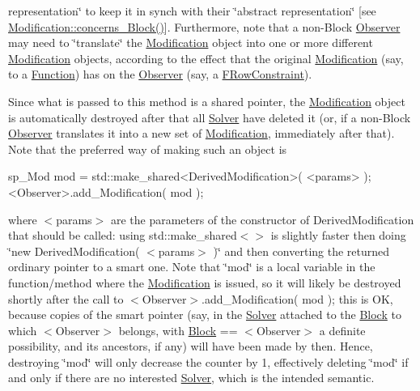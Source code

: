 representation\char`\"{} to keep it in synch with their \char`\"{}abstract representation\char`\"{} \mbox{[}see \mbox{\hyperlink{class_s_m_spp__di__unipi__it_1_1_modification_a22fe0cccfc755cfd89b240587d1f1cad}{Modification\+::concerns\+\_\+\+Block()}}\mbox{]}. Furthermore, note that a non-\/\+Block \mbox{\hyperlink{class_s_m_spp__di__unipi__it_1_1_observer}{Observer}} may need to \char`\"{}translate\char`\"{} the \mbox{\hyperlink{class_s_m_spp__di__unipi__it_1_1_modification}{Modification}} object into one or more different \mbox{\hyperlink{class_s_m_spp__di__unipi__it_1_1_modification}{Modification}} objects, according to the effect that the original \mbox{\hyperlink{class_s_m_spp__di__unipi__it_1_1_modification}{Modification}} (say, to a \mbox{\hyperlink{class_s_m_spp__di__unipi__it_1_1_function}{Function}}) has on the \mbox{\hyperlink{class_s_m_spp__di__unipi__it_1_1_observer}{Observer}} (say, a \mbox{\hyperlink{class_s_m_spp__di__unipi__it_1_1_f_row_constraint}{F\+Row\+Constraint}}).

Since what is passed to this method is a shared pointer, the \mbox{\hyperlink{class_s_m_spp__di__unipi__it_1_1_modification}{Modification}} object is automatically destroyed after that all \mbox{\hyperlink{class_s_m_spp__di__unipi__it_1_1_solver}{Solver}} have deleted it (or, if a non-\/\+Block \mbox{\hyperlink{class_s_m_spp__di__unipi__it_1_1_observer}{Observer}} translates it into a new set of \mbox{\hyperlink{class_s_m_spp__di__unipi__it_1_1_modification}{Modification}}, immediately after that). Note that the preferred way of making such an object is \begin{DoxyVerb}sp_Mod mod = std::make_shared<DerivedModification>( <params> );
<Observer>.add_Modification( mod );
\end{DoxyVerb}


where $<$params$>$ are the parameters of the constructor of Derived\+Modification that should be called\+: using std\+::make\+\_\+shared$<$$>$ is slightly faster then doing \char`\"{}new Derived\+Modification( $<$params$>$ )\char`\"{} and then converting the returned ordinary pointer to a smart one. Note that \char`\"{}mod\char`\"{} is a local variable in the function/method where the \mbox{\hyperlink{class_s_m_spp__di__unipi__it_1_1_modification}{Modification}} is issued, so it will likely be destroyed shortly after the call to $<$\+Observer$>$.add\+\_\+\+Modification( mod ); this is OK, because copies of the smart pointer (say, in the \mbox{\hyperlink{class_s_m_spp__di__unipi__it_1_1_solver}{Solver}} attached to the \mbox{\hyperlink{class_s_m_spp__di__unipi__it_1_1_block}{Block}} to which $<$\+Observer$>$ belongs, with \mbox{\hyperlink{class_s_m_spp__di__unipi__it_1_1_block}{Block}} == $<$\+Observer$>$ a definite possibility, and its ancestors, if any) will have been made by then. Hence, destroying \char`\"{}mod\char`\"{} will only decrease the counter by 1, effectively deleting \char`\"{}mod\char`\"{} if and only if there are no interested \mbox{\hyperlink{class_s_m_spp__di__unipi__it_1_1_solver}{Solver}}, which is the intended semantic.

